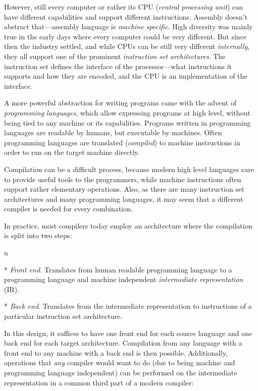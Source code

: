 However, still every computer or rather its CPU ({\em central processing unit})
can have different capabilities and support different instructions. Assembly
doesn't abstract that---assembly language is {\em machine specific}. High
diversity was mainly true in the early days where every computer could be
very different. But since then the industry settled, and while CPUs can be still
very different {\em internally}, they all support one of the prominent {\em
instruction set architectures}. The instruction set defines the interface of the
processor---what instructions it supports and how they are encoded, and the CPU
is an implementation of the interface.

A more powerful abstraction for writing programs came with the advent of {\em
programming languages}, which allow expressing programs at high level, without
being tied to any machine or its capabilities. Programs written in programming
languages are readable by humans, but executable by machines. Often programming
languages are translated ({\em compiled}) to machine instructions in order to
run on the target machine directly.

Compilation can be a difficult process, because modern high level languages care to
provide useful tools to the programmers, while machine instructions often
support rather elementary operations. Also, as there are many instruction set
architectures and many programming languages, it may seem that a different
compiler is needed for every combination.

In practice, most compilers today employ an architecture where the compilation
is split into two steps:

\begitems \style n

* {\em Front end}. Translates from human readable programming language to a
programming language and machine independent {\em intermediate representation}
(IR).

* {\em Back end}. Translates from the intermediate representation to instructions of
a particular instruction set architecture.

\enditems
%
In this design, it suffices to have one front end for each source language
and one back end for each target architecture. Compilation from any language
with a front end to any machine with a back end is then possible.
Additionally, operations that {\em any} compiler would want to do (due to being
machine and programming language independent) can be performed on the
intermediate representation in a common third part of a modern compiler:

